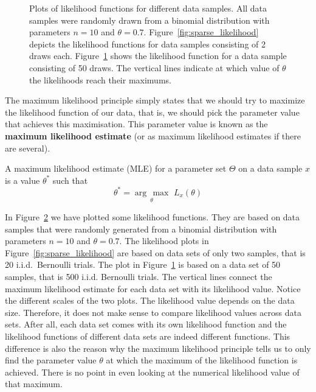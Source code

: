 \begin{figure}
\begin{subfigure}{\textwidth}
\caption{}
\label{fig:dense_likelihood} 
\end{subfigure}
\caption{Plots of likelihood functions for different data samples. All data samples were randomly drawn
from a binomial distribution with parameters $ n=10 $ and $ \theta=0.7 $. Figure~\ref{fig:sparse_likelihood}
depicts the likelihood functions for data samples consisting of 2 draws each. 
Figure~\ref{fig:dense_likelihood}
shows the likelihood function for a data sample consisting of 50 draws. The vertical lines indicate
at which value of $ \theta $ the likelihoods reach their maximums.}
\label{fig:likelihood_plots}
\end{figure}

The maximum likelihood principle simply states that we should try to maximize the likelihood function of
our data, that is, we should pick the parameter value that achieves this maximisation. This parameter value
is known as the \textbf{maximum likelihood estimate} (or as maximum likelihood estimates if there are several). 

\begin{Definition}
A maximum likelihood estimate (MLE) for a parameter set $ \Theta $  on a data sample $ x $ 
is a value $ \theta^{*} $ such that
$$ \theta^{*} = \underset{\theta}{\arg\,\max}\, \, L_{x}(\theta) $$
\end{Definition}

In Figure~\ref{fig:likelihood_plots} we have plotted some likelihood functions. They are based on data
samples that were randomly generated from a binomial distribution with parameters $ n=10 $ and 
$ \theta=0.7 $. The likelihood plots in Figure~\ref{fig:sparse_likelihood} are based on data sets of only
two samples, that is 20 i.i.d.\ Bernoulli trials. The plot in Figure~\ref{fig:dense_likelihood} is based on a 
data set of 50 samples, that is 500 i.i.d. Bernoulli trials. 
The vertical lines connect the maximum likelihood estimate
for each data set with its likelihood value. Notice the different scales of the two plots. The likelihood value depends on the
data size. Therefore, it does not make sense to compare likelihood values across data sets. After all, each data set comes with its own
likelihood function and the likelihood functions of different data sets are indeed different functions. This difference is also the
reason why the maximum likelihood principle tells us to only find the parameter value $ \theta $ at which the maximum of the
likelihood function is achieved. There is no point in even looking at the numerical likelihood value of that maximum.

